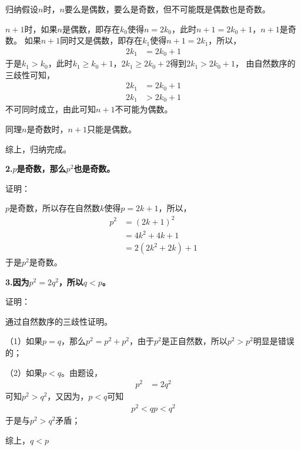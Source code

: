 \documentclass{article}
\theoremstyle{mystyle}
\begin{document}
归纳假设$n$时，$n$要么是偶数，要么是奇数，但不可能既是偶数也是奇数。

$n+1$时，如果$n$是偶数，即存在$k_0$使得$n=2k_0$，此时$n+1=2k_0+1$，$n+1$是奇数。
如果$n+1$同时又是偶数，即存在$k_1$使得$n+1=2k_1$，所以，
\begin{align*}
  2k_1 & = 2k_0 + 1
\end{align*}
于是$k_1 > k_0$，此时$k_1 \geq k_0+1$，$2k_1 \geq 2k_0 + 2$得到$2k_1 > 2k_0 + 1$，
由自然数序的三歧性可知，
\begin{align}
  2k_1 & = 2k_0 + 1 \\
  2k_1 & > 2k_0 + 1
\end{align}
不可同时成立，由此可知$n+1$不可能为偶数。

同理$n$是奇数时，$n+1$只能是偶数。

综上，归纳完成。

\textbf{2.$p$是奇数，那么$p^2$也是奇数。}

证明：

$p$是奇数，所以存在自然数$k$使得$p=2k+1$，所以，
\begin{align*}
  p^2 & = (2k+1)^2         \\
      & = 4k^2 + 4k + 1    \\
      & = 2(2k^2 + 2k) + 1
\end{align*}
于是$p^2$是奇数。


\textbf{3.因为$p^2 = 2q^2$，所以$q<p$。}

证明：

通过自然数序的三歧性证明。

（1）如果$p=q$，那么$p^2=p^2+p^2$，由于$p^2$是正自然数，所以$p^2>p^2$明显是错误的；

（2）如果$p<q$。由题设，
\begin{align*}
  p^2 & = 2q^2
\end{align*}
可知$p^2 > q^2$，又因为，$p<q$可知
\begin{align*}
  p^2 < qp < q^2
\end{align*}
于是与$p^2 > q^2$矛盾；

综上，$q<p$
\end{document}
